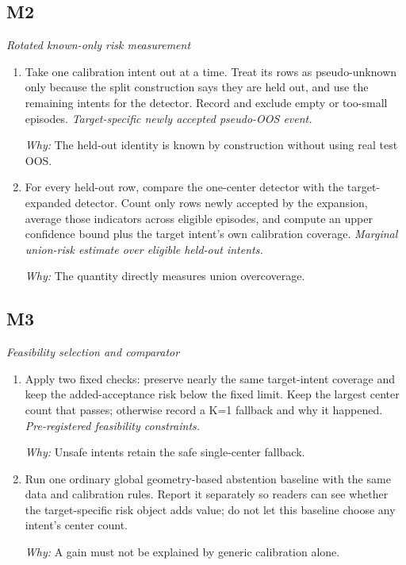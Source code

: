 \documentclass[10pt,a4paper]{article}
\begin{document}
\subsection*{M2}
\emph{Rotated known-only risk measurement}
\begin{enumerate}[leftmargin=*,start=3]
  \item Take one calibration intent out at a time. Treat its rows as pseudo-unknown only because the split construction says they are held out, and use the remaining intents for the detector. Record and exclude empty or too-small episodes.
\noindent\emph{Target-specific newly accepted pseudo-OOS event.}
\par{}
\par\emph{Why:} The held-out identity is known by construction without using real test OOS.
  \item For every held-out row, compare the one-center detector with the target-expanded detector. Count only rows newly accepted by the expansion, average those indicators across eligible episodes, and compute an upper confidence bound plus the target intent's own calibration coverage.
\noindent\emph{Marginal union-risk estimate over eligible held-out intents.}
\par{}
\par\emph{Why:} The quantity directly measures union overcoverage.
\end{enumerate}
\subsection*{M3}
\emph{Feasibility selection and comparator}
\begin{enumerate}[leftmargin=*,start=5]
  \item Apply two fixed checks: preserve nearly the same target-intent coverage and keep the added-acceptance risk below the fixed limit. Keep the largest center count that passes;\allowbreak{} otherwise record a K=1 fallback and why it happened.
\noindent\emph{Pre-registered feasibility constraints.}
\par{}
\par\emph{Why:} Unsafe intents retain the safe single-center fallback.
  \item Run one ordinary global geometry-based abstention baseline with the same data and calibration rules. Report it separately so readers can see whether the target-specific risk object adds value;\allowbreak{} do not let this baseline choose any intent's center count.
\par\emph{Why:} A gain must not be explained by generic calibration alone.
\end{enumerate}
\end{document}
